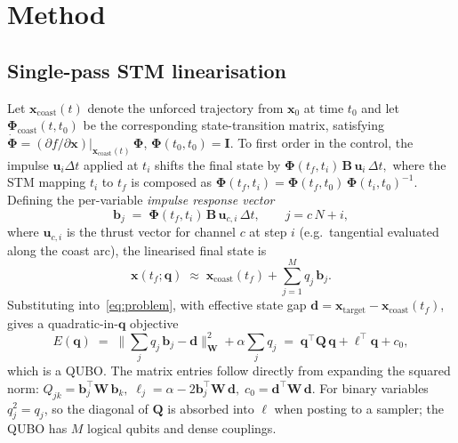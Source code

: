 \documentclass[11pt,a4paper]{article}
\theoremstyle{plain}
\newcommand{\bvec}[1]{\bm{#1}}
\newcommand{\xvec}{\bvec{x}}
\newcommand{\uvec}{\bvec{u}}
\newcommand{\qvec}{\bvec{q}}
\newcommand{\bbvec}{\bvec{b}}
\newcommand{\dvec}{\bvec{d}}
\newcommand{\Bmat}{\bvec{B}}
\newcommand{\Qmat}{\bvec{Q}}
\newcommand{\Wmat}{\bvec{W}}
\newcommand{\Iden}{\bvec{I}}
\newcommand{\Phimat}{\bvec{\Phi}}
\begin{document}
\section{Method}\label{sec:method}

\subsection{Single-pass STM linearisation}\label{sec:method-single}

Let $\xvec_\mathrm{coast}(t)$ denote the unforced trajectory from
$\xvec_0$ at time $t_0$ and let
$\Phimat_\mathrm{coast}(t, t_0)$ be the corresponding state-transition
matrix, satisfying
$\dot{\Phimat} = (\partial f/\partial \xvec)\big|_{\xvec_\mathrm{coast}(t)}\,
\Phimat$, $\Phimat(t_0, t_0) = \Iden$. To first order in the
control, the impulse $\uvec_i \Delta t$ applied at $t_i$ shifts the
final state by
\(
  \Phimat(t_f, t_i)\,\Bmat\, \uvec_i\, \Delta t,
\)
where the STM mapping $t_i$ to $t_f$ is composed as $\Phimat(t_f, t_i) =
\Phimat(t_f, t_0)\,\Phimat(t_i, t_0)^{-1}$. Defining the per-variable
\emph{impulse response vector}
\begin{equation}\label{eq:b-vec}
  \bbvec_j \;=\; \Phimat(t_f, t_i)\, \Bmat\, \uvec_{c,i}\, \Delta t,
  \qquad j = c\, N + i,
\end{equation}
where $\uvec_{c,i}$ is the thrust vector for channel $c$ at step
$i$ (e.g.~tangential evaluated along the coast arc), the linearised
final state is
\begin{equation}\label{eq:lin-final}
  \xvec(t_f; \qvec)
  \;\approx\;
  \xvec_\mathrm{coast}(t_f) + \sum_{j=1}^{M} q_j\, \bbvec_j .
\end{equation}
Substituting into~\eqref{eq:problem}, with effective state gap
$\dvec = \xvec_\mathrm{target} - \xvec_\mathrm{coast}(t_f)$, gives a
quadratic-in-$\qvec$ objective
\begin{equation}\label{eq:qubo}
  E(\qvec) \;=\;
  \Bigg\| \sum_{j} q_j\, \bbvec_j - \dvec \Bigg\|_{\Wmat}^2
  + \alpha \sum_j q_j
  \;=\;
  \qvec^\top \Qmat\, \qvec + \bvec{\ell}^\top \qvec + c_0 ,
\end{equation}
which is a QUBO. The matrix entries follow directly from
expanding the squared norm:
\(
  Q_{jk} = \bbvec_j^\top \Wmat\, \bbvec_k,\;
  \ell_j = \alpha - 2\bbvec_j^\top \Wmat\, \dvec,\;
  c_0 = \dvec^\top \Wmat\, \dvec.
\)
For binary variables $q_j^2 = q_j$, so the diagonal of $\Qmat$ is
absorbed into $\bvec{\ell}$ when posting to a sampler; the QUBO has
$M$ logical qubits and dense couplings.
\end{document}
